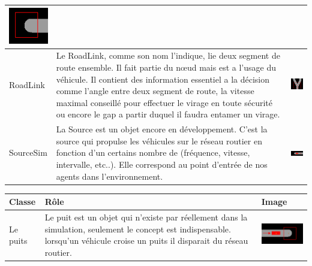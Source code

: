 \documentclass[a4paper,11pt]{article}
\begin{document}
\begin{tabular}{| M{2cm} | M{7cm} | M{4cm} |}
    \includegraphics[scale=0.5]{imgClasse/node4.png} \tabularnewline
    \hline
    \begin{large}RoadLink\end{large} & Le RoadLink, comme son nom l'indique, lie deux segment de route ensemble. Il fait partie du n\oe{}ud mais est a l'usage du véhicule. Il contient des information essentiel a la décision comme l'angle entre deux segment de route, la vitesse maximal conseillé pour effectuer le virage en toute sécurité ou encore le gap a partir duquel il faudra entamer un virage. & \includegraphics[scale=0.6]{imgClasse/roadlink.png} \tabularnewline
    \hline
    \begin{large}SourceSim\end{large} & La Source est un objet encore en développement. C'est la source qui propulse les véhicules sur le réseau routier en fonction d'un certains nombre de  (fréquence, vitesse, intervalle, etc..). Elle correspond au point d'entrée de nos agents dans l'environnement. & \includegraphics[scale=0.6]{imgClasse/source.png} \tabularnewline
    \hline
	\end{tabular}    
   
\hspace{-1.5cm} 
    \begin{tabular}{| M{2cm} | M{7cm} | M{4cm} |}
    \hline
    Classe & Rôle & Image \tabularnewline
    \hline
    \begin{large}Le puits\end{large} & Le puit est un objet qui n'existe par réellement dans la simulation, seulement le concept est indispensable. lorsqu'un véhicule croise un puits il disparait du réseau routier. & \includegraphics[scale=0.6]{imgClasse/puits.png} \tabularnewline
    \hline
 \end{tabular}
\end{document}
